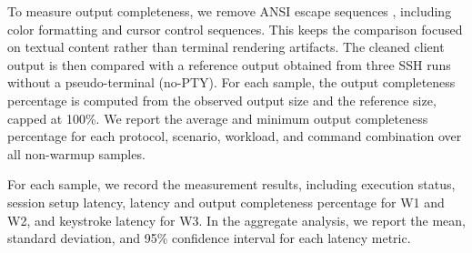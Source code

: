To measure output completeness, we remove ANSI escape sequences \cite{ECMA48}, including color formatting and cursor control sequences. This keeps the comparison focused on textual content rather than terminal rendering artifacts. The cleaned client output is then compared with a reference output obtained from three SSH runs without a pseudo-terminal (no-PTY). For each sample, the output completeness percentage is computed from the observed output size and the reference size, capped at 100\%. We report the average and minimum output completeness percentage for each protocol, scenario, workload, and command combination over all non-warmup samples.

For each sample, we record the measurement results, including execution status, session setup latency, latency and output completeness percentage for W1 and W2, and keystroke latency for W3. In the aggregate analysis, we report the mean, standard deviation, and 95\% confidence interval for each latency metric.